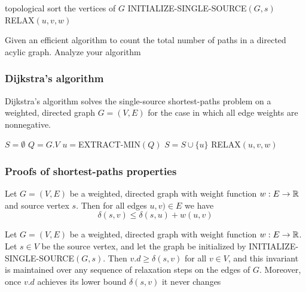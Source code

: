 \documentclass[11pt]{article}
\begin{document}
\begin{algorithmic}[1]
\State topological sort the vertices of \(G\)
\State INITIALIZE-SINGLE-SOURCE\((G,s)\)
        RELAX\((u,v,w)\)
    \EndFor
\EndFor
\EndProcedure
\end{algorithmic}

\begin{exercise}[24.2-4]
Given an efficient algorithm to count the total number of paths in a directed acylic graph.
Analyze your algorithm
\end{exercise}
\subsubsection{Dijkstra's algorithm}
\label{sec:orgd846e75}
Dijkstra's algorithm solves the single-source shortest-paths problem on a weighted, directed
graph \(G=(V,E)\) for the case in which all edge weights are nonnegative.
\begin{algorithmic}[1]
\State \(S=\emptyset\)
\State \(Q=G.V\)
    \State \(u=\)EXTRACT-MIN\((Q)\)
    \State \(S=S\cup\{u\}\)
        RELAX\((u,v,w)\)
    \EndFor
\EndWhile
\EndProcedure
\end{algorithmic}
\subsubsection{Proofs of shortest-paths properties}
\label{sec:org7335df6}
\begin{lemma}
Let \(G=(V,E)\) be a weighted, directed graph with weight function \(w:E\to\mathbb{R}\) and source
vertex \(s\). Then for all edges \(u,v)\in E\) we have
\begin{equation*}
\delta(s,v)\le\delta(s,u)+w(u,v)
\end{equation*}
\end{lemma}

\begin{lemma}
Let \(G=(V,E)\) be a weighted, directed graph with weight function \(w:E\to\mathbb{R}\). Let \(s\in V\) be
the source vertex, and let the graph be initialized by INITIALIZE-SINGLE-SOURCE\((G,s)\).
Then \(v.d\ge\delta(s,v)\) for all \(v\in V\), and this invariant is maintained over any sequence of
relaxation steps on the edges of \(G\). Moreover, once \(v.d\) achieves its lower
bound \(\delta(s,v)\) it never changes
\end{lemma}
\end{document}
